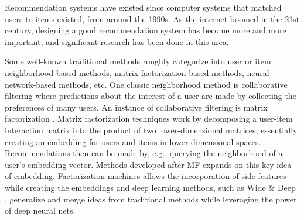\documentclass{article}
\begin{document}



Recommendation systems have existed since computer systems that matched users to items existed, from around the 1990s. As the internet boomed in the 21st century, designing a good recommendation system has become more and more important, and significant research has been done in this area. 

Some well-known traditional methods roughly categorize into user or item neighborhood-based methods, matrix-factorization-based methods, neural network-based methods, etc. One classic neighborhood method is collaborative filtering \cite{cf} where predictions about the interest of a user are made by collecting the preferences of many users. An instance of collaborative filtering is matrix factorization 
\cite{mf}. Matrix factorization techniques work by decomposing a user-item interaction matrix into the product of two lower-dimensional matrices, essentially creating an embedding for users and items in lower-dimensional spaces. Recommendations then can be made by, e.g., querying the neighborhood of a user's embedding vector. Methods developed after MF expands on this key idea of embedding. Factorization machines \cite{fm} allows the incorporation of side features while creating the embeddings and deep learning methods, such as Wide \& Deep \cite{wideanddeep}, generalize and merge ideas from traditional methods while leveraging the power of deep neural nets.
\end{document}

